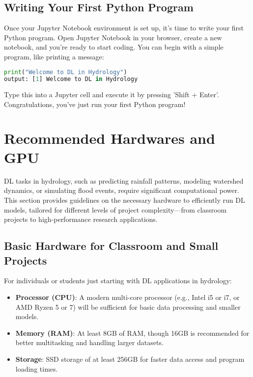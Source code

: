 \subsection{Writing Your First Python Program}
Once your Jupyter Notebook environment is set up, it's time to write your first Python program. Open Jupyter Notebook in your browser, create a new notebook, and you're ready to start coding. You can begin with a simple program, like printing a message:

\begin{lstlisting}[language=Python]
print("Welcome to DL in Hydrology")
output: [1] Welcome to DL in Hydrology
\end{lstlisting}

Type this into a Jupyter cell and execute it by pressing 'Shift + Enter'. Congratulations, you've just run your first Python program!

\section{Recommended Hardwares and GPU}

DL tasks in hydrology, such as predicting rainfall patterns, modeling watershed dynamics, or simulating flood events, require significant computational power. This section provides guidelines on the necessary hardware to efficiently run DL models, tailored for different levels of project complexity—from classroom projects to high-performance research applications.

\subsection{Basic Hardware for Classroom and Small Projects}
For individuals or students just starting with DL applications in hydrology:

\begin{itemize}
    \item \textbf{Processor (CPU)}: A modern multi-core processor (e.g., Intel i5 or i7, or AMD Ryzen 5 or 7) will be sufficient for basic data processing and smaller models.
    \item \textbf{Memory (RAM)}: At least 8GB of RAM, though 16GB is recommended for better multitasking and handling larger datasets.
    \item \textbf{Storage}: SSD storage of at least 256GB for faster data access and program loading times.
\end{itemize}

